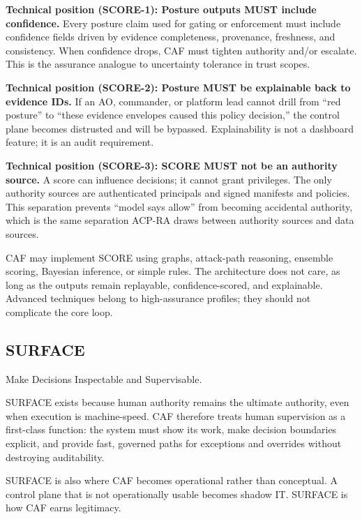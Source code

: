 \documentclass[11pt]{article}
\begin{document}
\textbf{Technical position (SCORE-1): Posture outputs MUST include
confidence.} Every posture claim used for gating or enforcement must
include confidence fields driven by evidence completeness, provenance,
freshness, and consistency. When confidence drops, CAF must tighten
authority and/or escalate. This is the assurance analogue to uncertainty
tolerance in trust scopes. \cite{ForceCreation}

\textbf{Technical position (SCORE-2): Posture MUST be explainable back
to evidence IDs.} If an AO, commander, or platform lead cannot drill
from ``red posture'' to ``these evidence envelopes caused this policy
decision,'' the control plane becomes distrusted and will be bypassed.
Explainability is not a dashboard feature; it is an audit requirement.

\textbf{Technical position (SCORE-3): SCORE MUST not be an authority
source.} A score can influence decisions; it cannot grant privileges.
The only authority sources are authenticated principals and signed
manifests and policies. This separation prevents ``model says allow''
from becoming accidental authority, which is the same separation ACP-RA
draws between authority sources and data sources. \cite{ACPRA}

CAF may implement SCORE using graphs, attack-path reasoning, ensemble
scoring, Bayesian inference, or simple rules. The architecture does not
care, as long as the outputs remain replayable, confidence-scored, and
explainable. Advanced techniques belong to high-assurance profiles; they
should not complicate the core loop.

\hypertarget{surface}{%
\subsection{SURFACE}\label{surface}}

\begin{calloutquote}
Make Decisions Inspectable and Supervisable.
\end{calloutquote}

SURFACE exists because human authority remains the ultimate authority,
even when execution is machine-speed. CAF therefore treats human
supervision as a first-class function: the system must show its work,
make decision boundaries explicit, and provide fast, governed paths for
exceptions and overrides without destroying auditability.

SURFACE is also where CAF becomes operational rather than conceptual. A
control plane that is not operationally usable becomes shadow IT.
SURFACE is how CAF earns legitimacy.
\end{document}
